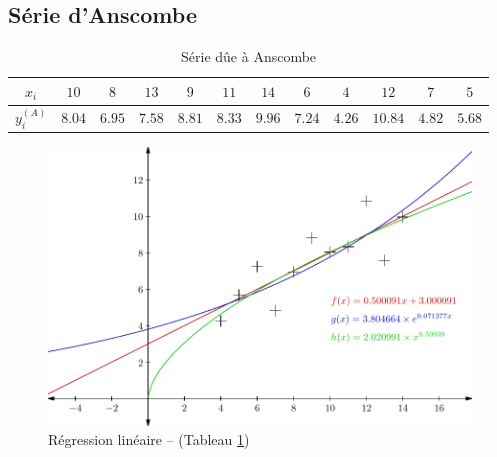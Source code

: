 \documentclass{report}
\begin{document}
      \subsection{Série d'Anscombe}
	\begin{table}[h]
	  \centering
	  \begin{tabular}{| c | c | c | c | c | c | c | c | c | c | c | c |}
	    \hline 
	    $x_{i}$ & $10$ & $8$ & $13$ & $9$ & $11$ & $14$ & $6$ & $4$ & $12$ & $7$ & $5$ \\ 
	    \hline 
	    $y^{(A)}_{i}$ & $8.04$ & $6.95$ & $7.58$ & $8.81$ & $8.33$ & $9.96$ & $7.24$ & $4.26$ & $10.84$ & $4.82$ & $5.68$ \\ 
	    \hline 
	  \end{tabular}
	  \caption{Série dûe à Anscombe}
	  \label{approx_tp2_ex1}
	\end{table}
	\begin{figure}[h]
	  \centering
	  \includegraphics{graphiques/pdf_output/reglin_tp2_ex1.pdf}
	  \caption{Régression linéaire -- (Tableau \ref{approx_tp2_ex1})}
	\end{figure}
	\newpage
\end{document}
